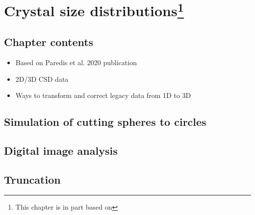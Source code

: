 \chapter[Crystal size distributions]{Crystal size distributions\footnote{This chapter is in part based on }}\label{ch:csd}

\section{Chapter contents}
\begin{itemize}
    \item Based on Paredis et al. 2020 publication
    \item 2D/3D CSD data
    \item Ways to transform and correct legacy data from 1D to 3D
\end{itemize}

\section{Simulation of cutting spheres to circles}
\section{Digital image analysis}
\section{Truncation}




\cleardoublepage

